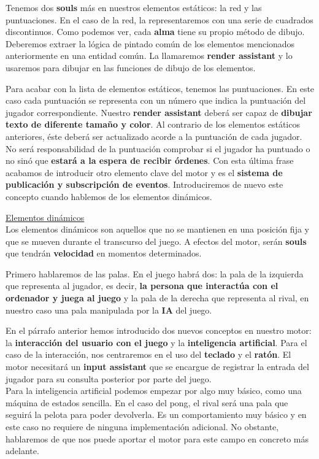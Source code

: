 \documentclass[a4paper]{article}
\begin{document}
Tenemos dos \textbf{souls} más en nuestros elementos estáticos: la red y las puntuaciones. En el caso de la red, la representaremos con una serie de cuadrados discontinuos. Como podemos ver, cada \textbf{alma} tiene su propio método de dibujo. Deberemos extraer la lógica de pintado común de los elementos mencionados anteriormente en una entidad común. La llamaremos \textbf{render assistant} y lo usaremos para dibujar en las funciones de dibujo de los elementos.

Para acabar con la lista de elementos estáticos, tenemos las puntuaciones. En este caso cada puntuación se representa con un número que indica la puntuación del jugador correspondiente. Nuestro \textbf{render assistant} deberá ser capaz de \textbf{dibujar texto de diferente tamaño y color}. Al contrario de los elementos estáticos anteriores, éste deberá ser actualizado acorde a la puntuación de cada jugador. No será responsabilidad de la puntuación comprobar si el jugador ha puntuado o no sinó que \textbf{estará a la espera de recibir órdenes}. Con esta última frase acabamos de introducir otro elemento clave del motor y es el \textbf{sistema de publicación y subscripción de eventos}. Introduciremos de nuevo este concepto cuando hablemos de los elementos dinámicos.

\underline{Elementos dinámicos} \\

Los elementos dinámicos son aquellos que no se mantienen en una posición fija y que se mueven durante el transcurso del juego. A efectos del motor, serán \textbf{souls} que tendrán \textbf{velocidad} en momentos determinados.

Primero hablaremos de las palas. En el juego habrá dos: la pala de la izquierda que representa al jugador, es decir, \textbf{la persona que interactúa con el ordenador y juega al juego} y la pala de la derecha que representa al rival, en nuestro caso una pala manipulada por la \textbf{IA} del juego.

En el párrafo anterior hemos introducido dos nuevos conceptos en nuestro motor: la \textbf{interacción del usuario con el juego} y la \textbf{inteligencia artificial}. Para el caso de la interacción, nos centraremos en el uso del \textbf{teclado} y el \textbf{ratón}. El motor necesitará un \textbf{input assistant} que se encargue de registrar la entrada del jugador para su consulta posterior por parte del juego. \\
Para la inteligencia artificial podemos empezar por algo muy básico, como una máquina de estados sencilla. En el caso del pong, el rival será una pala que seguirá la pelota para poder devolverla. Es un comportamiento muy básico y en este caso no requiere de ninguna implementación adicional. No obstante, hablaremos de que nos puede aportar el motor para este campo en concreto más adelante.
\end{document}
